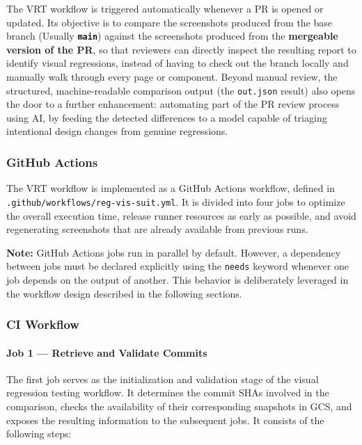 The \ac{VRT} workflow is triggered automatically whenever a \ac{PR} is opened or updated. Its objective is to compare the screenshots produced from the base branch (Usually \textbf{\texttt{main}}) against the screenshots produced from the \textbf{mergeable version of the \ac{PR}}, so that reviewers can directly inspect the resulting report to identify visual regressions, instead of having to check out the branch locally and manually walk through every page or component. Beyond manual review, the structured, machine-readable comparison output (the \texttt{out.json} result) also opens the door to a further enhancement: automating part of the \ac{PR} review process using \ac{AI}, by feeding the detected differences to a model capable of triaging intentional design changes from genuine regressions.

\subsubsection{GitHub Actions}

The \ac{VRT} workflow is implemented as a GitHub Actions workflow, defined in \texttt{\allowbreak .github/workflows/reg-vis-suit.yml}. It is divided into four jobs to optimize the overall execution time, release runner resources as early as possible, and avoid regenerating screenshots that are already available from previous runs.

\textbf{Note:} GitHub Actions jobs run in parallel by default. However, a dependency between jobs must be declared explicitly using the \texttt{needs} keyword whenever one job depends on the output of another. This behavior is deliberately leveraged in the workflow design described in the following sections.

\subsubsection{CI Workflow}

\paragraph{Job 1 --- Retrieve and Validate Commits}

The first job serves as the initialization and validation stage of the visual regression testing workflow. It determines the commit SHAs involved in the comparison, checks the availability of their corresponding snapshots in \ac{GCS}, and exposes the resulting information to the subsequent jobs. It consists of the following steps:

